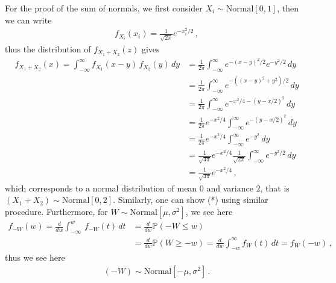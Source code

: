 \documentclass[11pt, onesided]{book}
\theoremstyle{break}
\theoremstyle{break}
\begin{document}
For the proof of the sum of normals, we first consider $X_i\sim \text{Normal}[0,1]$, then we can write
\begin{align*}
f_{X_i}(x_i) = \frac{1}{\sqrt{2\pi}}e^{-x_i^2/2}\,,
\end{align*}
thus the distribution of $f_{X_1 + X_2}(z)$ gives
\begin{align*}
f_{X_1 + X_2}(x) = \int_{-\infty}^\infty f_{X_1}(x-y)\, f_{X_2}(y)\, dy
&= \frac{1}{2\pi}\int_{-\infty}^\infty e^{-(x-y)^2/2} e^{-y^2/2}\, dy\\
&= \frac{1}{2\pi}\int_{-\infty}^\infty e^{-((x-y)^2 + y^2)/2}\, dy\\
&= \frac{1}{2\pi}\int_{-\infty}^\infty e^{-x^2/4 - (y-x/2)^2}\, dy\\ 
&= \frac{1}{2\pi}e^{-x^2/4}\int_{-\infty}^\infty e^{-(y-x/2)^2}\, dy\\
&= \frac{1}{2\pi}e^{-x^2/4}\int_{-\infty}^\infty e^{-y^2}\, dy\\
&= \frac{1}{\sqrt{4\pi}}e^{-x^2/4}\frac{1}{\sqrt{2\pi}} \int_{-\infty}^\infty e^{-y^2/2}\, dy\\
&= \frac{1}{\sqrt{4\pi}}e^{-x^2/4}\,,
\end{align*}
which corresponds to a normal distribution of mean $0$ and variance $2$, that is $(X_1 + X_2) \sim \text{Normal}[0,2]$. Similarly, one can show (*) using similar procedure. Furthermore, for $W\sim\text{Normal}[\mu, \sigma^2]$, we see here
\begin{align*}
f_{-W}(w) = \frac{d}{dw}\int_{-\infty}^{w}\, f_{-W}(t)\, dt &= \frac{d}{dw}\mathbb{P}(-W \leq w) \\
&= \frac{d}{dw}\mathbb{P}(W\geq -w) =\frac{d}{dw} \int_{-w}^\infty  f_W(t)\, dt = f_W(-w)\,,
\end{align*}
thus we see here
\begin{align*}
(-W) \sim \text{Normal}[-\mu,\sigma^2]\,.
\end{align*}
\end{document}
